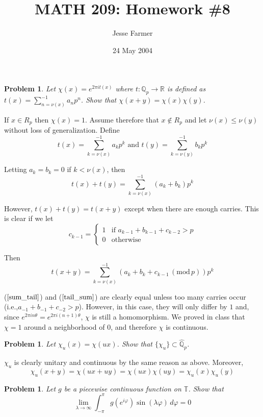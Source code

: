\documentclass[letterpaper,11pt]{article}
\title{MATH 209: Homework \#8}
\author{Jesse Farmer}
\date{24 May 2004}
\newtheorem{problem}[theorem]{Problem}
\newcommand{\R}{\mathbb{R}}
\newcommand{\Q}{\mathbb{Q}}
\newcommand{\T}{\mathbb{T}}
\begin{document}
\maketitle
\begin{problem}
Let $\chi(x) = e^{2\pi it(x)}$ where $t: \Q_p \rightarrow \R$ is defined as $t(x) = \sum_{n=\nu(x)}^{-1} a_n p^n$.  Show that $\chi(x+y) = \chi(x)\chi(y)$.
\end{problem}

If $x \in R_p$ then $\chi(x) = 1$.  Assume therefore that $x \notin R_p$ and let $\nu(x) \leq \nu(y)$ without loss of generalization.  Define
\[
t(x) = \sum_{k=\nu(x)}^{-1} a_k p^k \mbox{ and } t(y) = \sum_{k=\nu(y)}^{-1} b_k p^k
\]

Letting $a_k=b_k = 0$ if $k < \nu(x)$, then
\begin{equation}
\label{sum_tail}
t(x) + t(y) = \sum_{k=\nu(x)}^{-1} (a_k + b_k)p^k
\end{equation}

However, $t(x) + t(y) = t(x + y)$ except when there are enough carries.  This is clear if we let
\[
c_{k-1} = \begin{cases} 1 & \text{if $a_{k-1} + b_{k-1} + c_{k-2} > p$}\\ 0 & \text{otherwise} \end{cases}
\]

Then
\begin{equation}
\label{tail_sum}
t(x+y) = \sum_{k=\nu(x)}^{-1} (a_k + b_k + c_{k-1} \,(\text{mod} \,p))p^k
\end{equation}

($\ref{sum_tail}$) and ($\ref{tail_sum}$) are clearly equal unless too many carries occur (i.e.,$a_{-1} + b_{-1} + c_{-2} > p$).   However, in this case, they will only differ by $1$ and, since $e^{2\pi in\theta} = e^{2\pi i(n+1)\theta}$, $\chi$ is still a homomorphism.  We proved in class that $\chi = 1$ around a neighborhood of $0$, and therefore $\chi$ is continuous.

\begin{problem}
Let $\chi_u(x) = \chi(ux)$.  Show that $\{\chi_u\} \subset \hat{\Q}_p$.
\end{problem}

$\chi_u$ is clearly unitary and continuous by the same reason as above.  Moreover,
\[
\chi_u(x+y) = \chi(ux+uy) = \chi(ux)\chi(uy) = \chi_u(x)\chi_u(y)
\]

\begin{problem}
Let $g$ be a piecewise continuous function on $\T$.  Show that
\[
\lim_{\lambda \rightarrow \infty} \int_{-\pi}^{\pi} g(e^{i\varphi}) \sin(\lambda\varphi) \,d\varphi = 0
\]
\end{problem}
\end{document}
